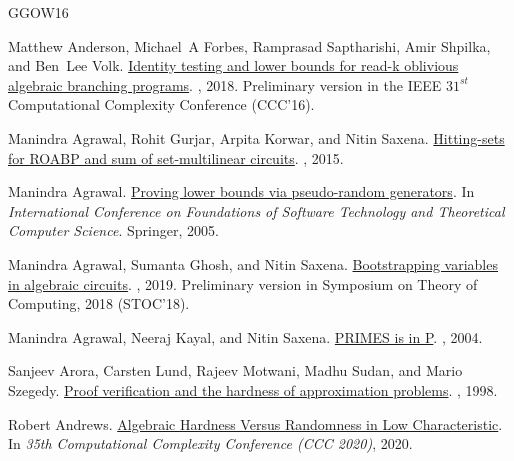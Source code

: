 \documentclass[10pt,a4paper]{article}
\numberwithin{equation}{section}
\begin{document}
\newcommand{\etalchar}[1]{$^{#1}$}
\begin{thebibliography}{GGOW16}

\bibitem[AFS{\etalchar{+}}18]{anderson2018identity}
Matthew Anderson, Michael~A Forbes, Ramprasad Saptharishi, Amir Shpilka, and
  Ben~Lee Volk.
\newblock \href{https://dl.acm.org/doi/10.1145/3170709}{Identity testing and
  lower bounds for read-k oblivious algebraic branching programs}.
, 2018.
\newblock Preliminary version in the IEEE $31^{st}$ Computational Complexity
  Conference (CCC'16).

Manindra Agrawal, Rohit Gurjar, Arpita Korwar, and Nitin Saxena.
\newblock \href{https://epubs.siam.org/doi/abs/10.1137/140975103}{Hitting-sets
  for ROABP and sum of set-multilinear circuits}.
, 2015.

Manindra Agrawal.
\newblock \href{https://link.springer.com/chapter/10.1007/11590156_6}{Proving
  lower bounds via pseudo-random generators}.
\newblock In {\em International Conference on Foundations of Software
  Technology and Theoretical Computer Science}. Springer, 2005.

Manindra Agrawal, Sumanta Ghosh, and Nitin Saxena.
\newblock \href {http://dx.doi.org/10.1073/pnas.1901272116}
  {\href{10.1073/pnas.1901272116}{Bootstrapping variables in algebraic
  circuits}}.
, 2019.
\newblock Preliminary version in Symposium on Theory of Computing, 2018
  (STOC'18).

Manindra Agrawal, Neeraj Kayal, and Nitin Saxena.
\newblock \href{https://annals.math.princeton.edu/2004/160-2/p12}{PRIMES is in
  {P}}.
, 2004.

\bibitem[ALM{\etalchar{+}}98]{arora1998proof}
Sanjeev Arora, Carsten Lund, Rajeev Motwani, Madhu Sudan, and Mario Szegedy.
\newblock \href{https://dl.acm.org/doi/10.1145/278298.278306}{Proof
  verification and the hardness of approximation problems}.
, 1998.

Robert Andrews.
\newblock \href{https://doi.org/10.4230/LIPIcs.CCC.2020.37}{Algebraic Hardness
  Versus Randomness in Low Characteristic}.
\newblock In {\em 35th Computational Complexity Conference (CCC 2020)}, 2020.


\end{thebibliography}
\end{document}
